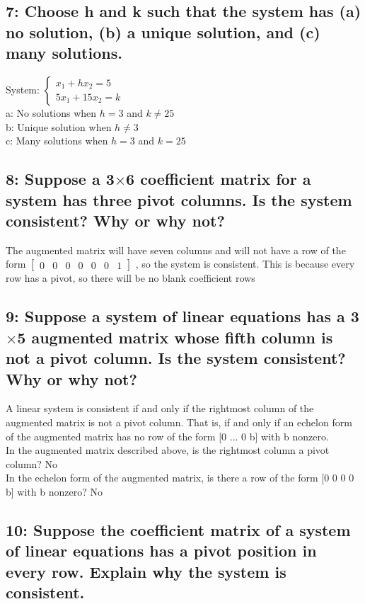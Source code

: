 \documentclass{article}
\begin{document}
\subsection*{7: Choose h and k such that the system has (a) no solution, (b) a unique solution, and (c) many solutions.}
System:
$\begin{cases}
    x_1+hx_2=5\\
    5x_1+ 15x_2=k
\end{cases}$
\\a: No solutions when $h=3$ and $k \neq 25$
\\b: Unique solution when $h\neq3$
\\c: Many solutions when $h=3$ and $k=25$
\subsection*{8: Suppose a 3$\times$6 coefficient matrix for a system has three pivot columns. Is the system consistent? Why or why not?}
The augmented matrix will have seven columns and will not have a row of the form $\left[\begin{array}{cccccc|c}
    0&0&0&0&0&0&1
\end{array}\right]$
, so the system is consistent. This is because every row has a pivot, so there will be no blank coefficient rows
\subsection*{9: Suppose a system of linear equations has a 3$\times$5 augmented matrix whose fifth column is not a pivot column. Is the system consistent? Why or why not?}
A linear system is consistent if and only if the rightmost column of the augmented matrix is not a pivot column. That is, if and only if an echelon form of the augmented matrix has no row of the form [0 ... 0 b] with b nonzero.
\\In the augmented matrix described above, is the rightmost column a pivot column? No
\\ In the echelon form of the augmented matrix, is there a row of the form [0 0 0 0 b] with b nonzero? No
\\ 
\subsection*{10: Suppose the coefficient matrix of a system of linear equations has a pivot position in every row. Explain why the system is consistent.}
\end{document}
